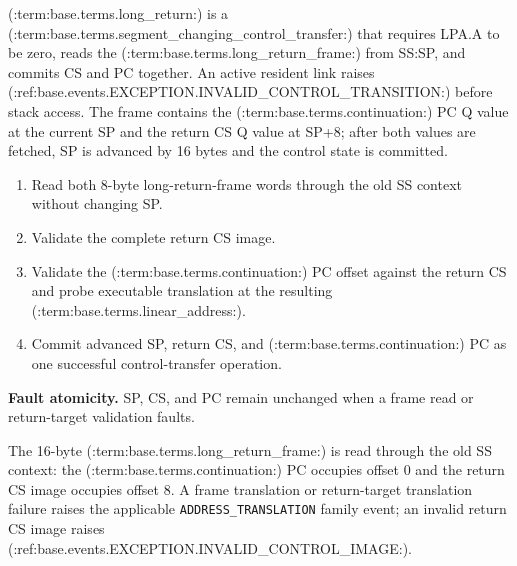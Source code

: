 (:term:base.terms.long_return:) is a (:term:base.terms.segment_changing_control_transfer:) that requires LPA.A to be zero, reads the (:term:base.terms.long_return_frame:) from SS:SP, and commits CS and PC together. An active resident link raises (:ref:base.events.EXCEPTION.INVALID_CONTROL_TRANSITION:) before stack access. The frame contains the (:term:base.terms.continuation:) PC Q value at the current SP and the return CS Q value at SP+8; after both values are fetched, SP is advanced by 16 bytes and the control state is committed.

\begin{enumerate}
\item Read both 8-byte long-return-frame words through the old SS context without changing SP.
\item Validate the complete return CS image.
\item Validate the (:term:base.terms.continuation:) PC offset against the return CS and probe executable translation at the resulting (:term:base.terms.linear_address:).
\item Commit advanced SP, return CS, and (:term:base.terms.continuation:) PC as one successful control-transfer operation.
\end{enumerate}

\textbf{Fault atomicity.} SP, CS, and PC remain unchanged when a frame read or return-target validation faults.

The 16-byte (:term:base.terms.long_return_frame:) is read through the old SS context: the (:term:base.terms.continuation:) PC occupies offset 0 and the return CS
image occupies offset 8. A frame translation or return-target translation failure raises the applicable
\texttt{ADDRESS\_TRANSLATION} family event; an invalid return CS image raises (:ref:base.events.EXCEPTION.INVALID_CONTROL_IMAGE:).
